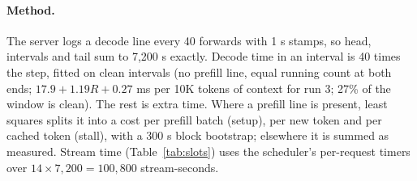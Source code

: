 \paragraph{Method.}
The server \citep{zheng2023sglang} logs a decode line every 40 forwards with 1 s stamps, so head, intervals and tail sum to 7,200 s exactly. %
Decode time in an interval is 40 times the step, fitted on clean intervals (no prefill line, equal running count at both ends; $17.9+1.19R+0.27$ ms per 10K tokens of context for run 3; 27\% of the window is clean). %
The rest is extra time. Where a prefill line is present, least squares splits it into a cost per prefill batch (setup), per new token and per cached token (stall), with a 300 s block bootstrap; elsewhere it is summed as measured. %
Stream time (Table~\ref{tab:slots}) uses the scheduler's per-request timers over $14\times7{,}200=100{,}800$ stream-seconds. %

